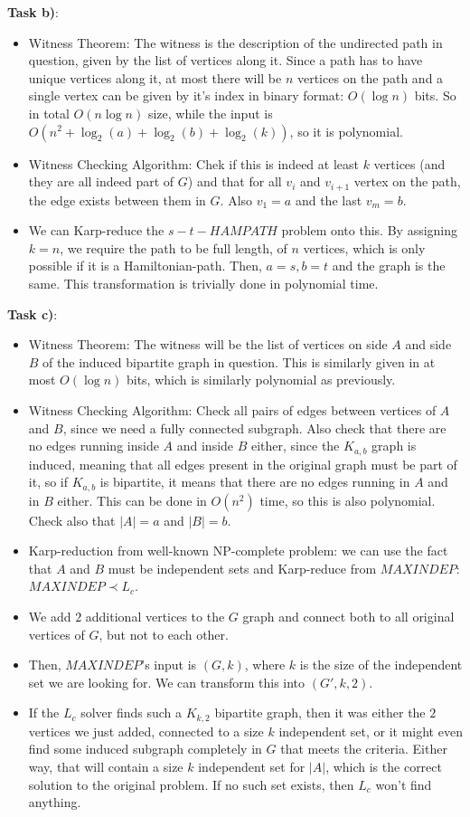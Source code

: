 \textbf{Task b)}:

\begin{itemize}
    \item Witness Theorem: The witness is the description of the undirected path in question, given by the list of vertices along it. Since a path has to have unique vertices along it, at most there will be $n$ vertices on the path and a single vertex can be given by it's index in binary format: $O(\log{}n)$ bits. So in total $O(n\log{}n)$ size, while the input is $O(n^2+\log_2(a)+\log_2(b)+\log_2(k))$, so it is polynomial.
    \item Witness Checking Algorithm: Chek if this is indeed at least $k$ vertices (and they are all indeed part of $G$) and that for all $v_i$ and $v_{i+1}$ vertex on the path, the edge exists between them in $G$. Also $v_1=a$ and the last $v_m=b$.
    \item We can Karp-reduce the $s-t-HAMPATH$ problem onto this. By assigning $k=n$, we require the path to be full length, of $n$ vertices, which is only possible if it is a Hamiltonian-path. Then, $a=s, b=t$ and the graph is the same. This transformation is trivially done in polynomial time.
\end{itemize}

\textbf{Task c)}:
\begin{itemize}
    \item Witness Theorem: The witness will be the list of vertices on side $A$ and side $B$ of the induced bipartite graph in question. This is similarly given in at most $O(\log{}n)$ bits, which is similarly polynomial as previously.
    \item Witness Checking Algorithm: Check all pairs of edges between vertices of $A$ and $B$, since we need a fully connected subgraph. Also check that there are no edges running inside $A$ and inside $B$ either, since the $K_{a,b}$ graph is induced, meaning that all edges present in the original graph must be part of it, so if $K_{a,b}$ is bipartite, it means that there are no edges running in $A$ and in $B$ either. This can be done in $O(n^2)$ time, so this is also polynomial. Check also that $|A|=a$ and $|B|=b$.
    \item Karp-reduction from well-known NP-complete problem: we can use the fact that $A$ and $B$ must be independent sets and Karp-reduce from $MAXINDEP$: $MAXINDEP \prec{} L_c$.
    \item We add $2$ additional vertices to the $G$ graph and connect both to all original vertices of $G$, but not to each other.
    \item Then, $MAXINDEP$'s input is $(G,k)$, where $k$ is the size of the independent set we are looking for. We can transform this into $(G', k, 2)$.
    \item If the $L_c$ solver finds such a $K_{k,2}$ bipartite graph, then it was either the $2$ vertices we just added, connected to a size $k$ independent set, or it might even find some induced subgraph completely in $G$ that meets the criteria. Either way, that will contain a size $k$ independent set for $|A|$, which is the correct solution to the original problem. If no such set exists, then $L_c$ won't find anything.
\end{itemize}

